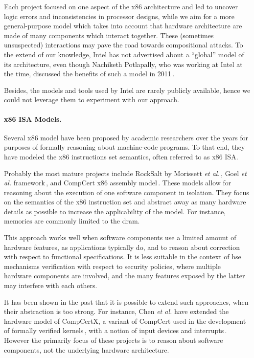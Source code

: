 Each project focused on one aspect of the x86 architecture and led to uncover
logic errors and inconsistencies in processor designs, while we aim for a more
general-purpose model which takes into account that hardware architecture are
made of many components which interact together.
%
These (sometimes unsuspected) interactions may pave the road towards
compositional attacks.
%
To the extend of our knowledge, Intel has not advertised about a ``global''
model of its architecture, even though Nachiketh Potlapally, who was working at
Intel at the time, discussed the benefits of such a model in
2011\,\cite{potlapally2011hardwaresecurity}.

Besides, the models and tools used by Intel are rarely publicly available, hence
we could not leverage them to experiment with our approach.

\paragraph{x86 ISA Models.}
%
Several x86 model have been proposed by academic researchers over the years for
purposes of formally reasoning about machine-code programs.
%
To that end, they have modeled the x86 instructions set semantics, often
referred to as x86 ISA.

Probably the most mature projects include RockSalt by Morissett \emph{et
  al.}\,\cite{morrisett2012rocksalt}, Goel \emph{et al.}
framework\,\cite{goel2014x86}, and CompCert x86 assembly
model\,\cite{leroy2012compcert}.
%
These models allow for reasoning about the execution of one software component
in isolation. They focus on the semantics of the x86 instruction set and
abstract away as many hardware details as possible to increase the applicability
of the model.
%
For instance, memories are commonly limited to the \ac{dram}.

This approach works well when software components use a limited amount of
hardware features, as applications typically do, and to reason about correction
with respect to functional specifications.
%
It is less suitable in the context of \ac{hse} mechanisms verification with
respect to security policies, where multiple hardware components are involved,
and the many features exposed by the latter may interfere with each others.

It has been shown in the past that it is possible to extend such approaches,
when their abstraction is too strong.
%
For instance, Chen \emph{et al.} have extended the hardware model of CompCertX,
a variant of CompCert used in the development of formally verified
kernels\,\cite{gu2016certikos}, with a notion of input devices and
interrupts\,\cite{chen2018interrupt}.
%
However the primarily focus of these projects is to reason about software
components, not the underlying hardware architecture.

